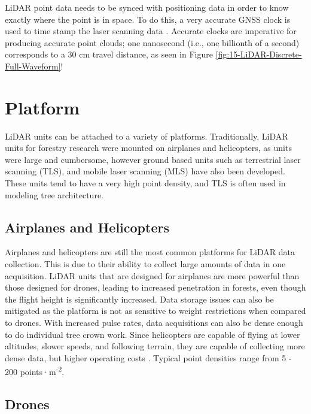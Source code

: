 \documentclass[
]{book}
\begin{document}
LiDAR point data needs to be synced with positioning data in order to know exactly where the point is in space. To do this, a very accurate GNSS clock is used to time stamp the laser scanning data \citep{uf_geomatics_-_fort_lauderdale_lidar_2016-1}. Accurate clocks are imperative for producing accurate point clouds; one nanosecond (i.e., one billionth of a second) corresponds to a 30 cm travel distance, as seen in Figure \ref{fig:15-LiDAR-Discrete-Full-Waveform}!

\section{Platform}\label{platform}

LiDAR units can be attached to a variety of platforms. Traditionally, LiDAR units for forestry research were mounted on airplanes and helicopters, as units were large and cumbersome, however ground based units such as terrestrial laser scanning (TLS), and mobile laser scanning (MLS) have also been developed. These units tend to have a very high point density, and TLS is often used in modeling tree architecture.

\subsection{Airplanes and Helicopters}\label{airplanes-and-helicopters}

Airplanes and helicopters are still the most common platforms for LiDAR data collection. This is due to their ability to collect large amounts of data in one acquisition. LiDAR units that are designed for airplanes are more powerful than those designed for drones, leading to increased penetration in forests, even though the flight height is significantly increased. Data storage issues can also be mitigated as the platform is not as sensitive to weight restrictions when compared to drones. With increased pulse rates, data acquisitions can also be dense enough to do individual tree crown work. Since helicopters are capable of flying at lower altitudes, slower speeds, and following terrain, they are capable of collecting more dense data, but higher operating costs \citep{white_best_2013}. Typical point densities range from 5 - 200 points·m\textsuperscript{-2}.

\subsection{Drones}\label{drones}
\end{document}

